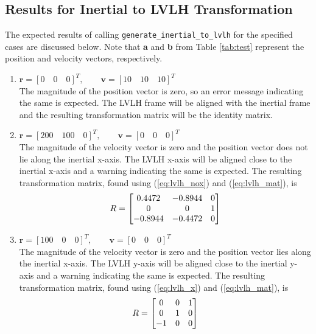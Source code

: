 \documentclass[11pt,fleqn]{report}
\begin{document}
\subsection{Results for Inertial to LVLH Transformation}
The expected results of calling \texttt{generate\_inertial\_to\_lvlh} for the
specified cases are discussed below. Note that \textbf{a} and \textbf{b} from
Table \ref{tab:test} represent the position and velocity vectors, respectively.
\begin{enumerate}
 \item $\textbf{r} = [0 \quad 0 \quad 0]^T, \qquad
\textbf{v} = [10 \quad 10 \quad 10]^T$ \\
 The magnitude of the position vector is zero, so an error message
 indicating the same is expected. The LVLH frame will be aligned with
 the inertial frame and the resulting transformation matrix will be
 the identity matrix.

 \item $\textbf{r} = [200 \quad 100 \quad 0]^T, \qquad
\textbf{v} = [0 \quad 0 \quad 0]^T$ \\
 The magnitude of the velocity vector is zero and the position vector
 does not lie along the inertial x-axis. The LVLH x-axis will be
 aligned close to the inertial x-axis and a warning indicating the
 same is expected. The resulting transformation matrix, found using
 (\ref{eq:lvlh_nox}) and (\ref{eq:lvlh_mat}), is
 \begin{equation*}
\hfill R = \begin{bmatrix} 0.4472 & -0.8944 & 0 \\
 0&0& 1 \\
-0.8944 & -0.4472 & 0
 \end{bmatrix} \hfill
 \end{equation*}

 \item $\textbf{r} = [100 \quad 0 \quad 0]^T, \qquad
\textbf{v} = [0 \quad 0 \quad 0]^T$ \\
 The magnitude of the velocity vector is zero and the position vector
 lies along the inertial x-axis. The LVLH y-axis will be aligned close
 to the inertial y-axis and a warning indicating the same is expected.
 The resulting transformation matrix, found using (\ref{eq:lvlh_x})
 and (\ref{eq:lvlh_mat}), is
 \begin{equation*}
 \hfill R = \begin{bmatrix} 0 & 0 & 1 \\
0 & 1 & 0 \\
-1 & 0 & 0
\end{bmatrix} \hfill
 \end{equation*}


\end{enumerate}
\end{document}
